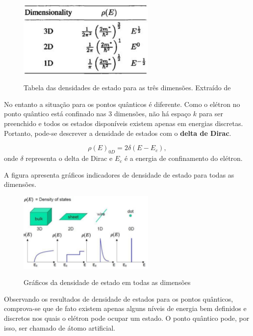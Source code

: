 \begin{figure}[H]
  \caption{Tabela das densidades de estado para as três dimensões. Extraído de \cite{confinamento3}}
  \centering
  \includegraphics[width=0.6\textwidth]{images/figura12.jpg}
  \label{fig12}
\end{figure}

\par No entanto a situação para os pontos quânticos é diferente. Como o elétron no ponto quântico está confinado nas 3 dimensões, não há espaço $k$ para ser preenchido e todos os estados disponíveis existem apenas em energias discretas. Portanto, pode-se descrever a densidade de estados com o \textbf{delta de Dirac}. 

\begin{equation}
	\label{confinamento_8}
	 \rho(E)_{0D} = 2\delta(E-E_{c}),
\end{equation}
onde $\delta$ representa o delta de Dirac e $E_{c}$ é a energia de confinamento do elétron.

\par A figura  apresenta gráficos indicadores de densidade de estado para todas as dimensões.

\begin{figure}[H]
  \caption{Gráficos da densidade de estado em todas as dimensões}
  \centering
  \includegraphics[width=0.6\textwidth]{images/figura13.jpg}
  \label{fig13}
\end{figure}

\par Observando os resultados de densidade de estados para os pontos quânticos, comprova-se que de fato existem apenas alguns níveis de energia bem definidos e discretos nos quais o elétron pode ocupar um estado. O ponto quântico pode, por isso, ser chamado de átomo artificial. 